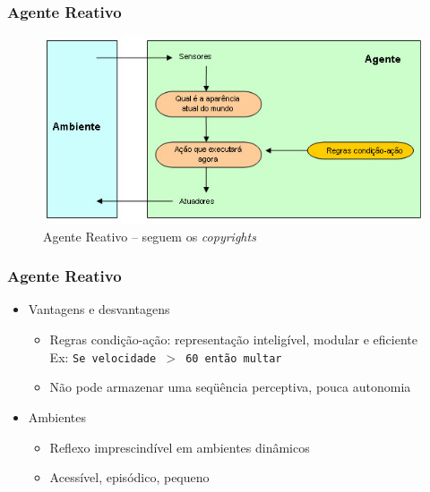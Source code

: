 \begin{frame} %

\frametitle{Agente Reativo}

\begin{figure}[!ht]
  \centering
  \includegraphics[height =.6\textheight,width=.7\textwidth]
  {figuras/agente_reativo.jpg}
  \caption{Agente Reativo -- seguem os \textit{copyrights}}
\end{figure}

\end{frame}




\begin{frame} %

    \frametitle{Agente Reativo}

\begin{itemize}
  \item Vantagens e desvantagens
  \begin{itemize}
    \item Regras condição-ação: representação inteligível, modular e eficiente\\ 
Ex: \texttt{Se velocidade $>$ 60 então multar}
   \item Não pode armazenar uma seqüência perceptiva, pouca autonomia
  \end{itemize}
  
  \item Ambientes
\begin{itemize}
  \item Reflexo imprescindível em ambientes dinâmicos 
  \item Acessível, episódico, pequeno 
\end{itemize}
  
\end{itemize}
\end{frame}



